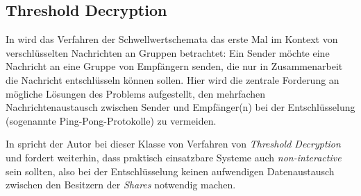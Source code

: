 \subsection{Threshold Decryption}


\label{sec_basics_threshold_thresholddecryption}

In \cite{desmedt1987} wird das Verfahren der Schwellwertschemata das erste Mal im Kontext von verschlüsselten Nachrichten an Gruppen betrachtet: Ein Sender möchte eine Nachricht an eine Gruppe von Empfängern senden, die nur in Zusammenarbeit die Nachricht entschlüsseln können sollen. Hier wird die zentrale Forderung an mögliche Lösungen des Problems aufgestellt, den mehrfachen Nachrichtenaustausch zwischen Sender und Empfänger(n) bei der Entschlüsselung (sogenannte Ping-Pong-Protokolle) zu vermeiden. 

In \cite{desmedt1993} spricht der Autor bei dieser Klasse von Verfahren von \textit{Threshold Decryption} und fordert weiterhin, dass praktisch einsatzbare Systeme auch \textit{non-interactive} sein sollten, also bei der Entschlüsselung keinen aufwendigen Datenaustausch zwischen den Besitzern der \textit{Shares} notwendig machen.

